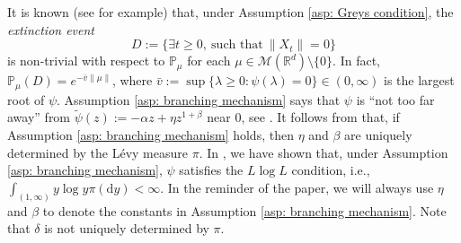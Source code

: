 \documentclass[12pt,a4paper]{amsart}
\theoremstyle{plain}
\theoremstyle{definition}
\numberwithin{equation}{section}
\begin{document}
It is known (see \cite[Theorems 12.5 \& 12.7]{Kyprianou2014Fluctuations} for example) that, under Assumption \ref{asp: Greys condition}, the \emph{extinction event}
$$D :=\{\exists t\geq 0,~\text{such that}~ \|X_t\| =0 \}$$
is non-trivial with respect to $\mathbb P_\mu$ for each  $\mu \in \mathcal M(\mathbb R^d)\setminus\{0\}$.
In fact, $ \mathbb{P}_{\mu} (D) = e^{-\bar v \|\mu\|}$, where $ \bar v := \sup\{\lambda \geq 0: \psi(\lambda) = 0\} \in (0,\infty) $ is the largest root of $\psi$.
Assumption \ref{asp: branching mechanism} says that $\psi$ is ``not too far away'' from $\widetilde \psi(z) := - \alpha z + \eta z^{1+\beta}$ near $0$, see \cite[Remark 1.3]{RenSongSunZhao2019Stable}.
It follows from \cite[Lemma 2.2]{RenSongSunZhao2019Stable}  that, if Assumption \ref{asp: branching mechanism} holds, then $\eta$ and $\beta$ are uniquely determined by the L\'evy measure $\pi$.
In \cite[Lemma 2.3]{RenSongSunZhao2019Stable}, we have shown  that,
under Assumption \ref{asp: branching mechanism},
 $\psi$ satisfies the $L \log L$ condition, i.e., $ \int_{(1,\infty)} y\log y \pi(\mathrm dy) < \infty. $
In the reminder of the paper, we will always use $\eta$ and $\beta$ to denote the constants in Assumption  \ref{asp: branching mechanism}.
	Note that $\delta$ is not uniquely determined by $\pi$.
\end{document}
